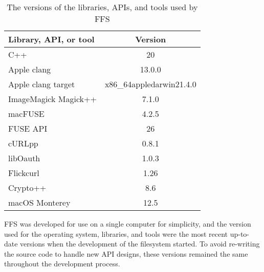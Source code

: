 \begin{table}[!ht]
	\begin{center}
		\caption{The versions of the libraries, APIs, and tools used by \gls{FFS}}
		\begin{tabular}{| l || c |}
			
			\hline

			\textbf{Library, API, or tool} & \textbf{Version}\\
			
			\hline
			\hline
			
				C++						& 20 \\
				Apple clang 			& 13.0.0\\
				Apple clang target		& x86\_64\-apple\-darwin21.4.0\\
				ImageMagick Magick++	& 7.1.0\-29\\
				macFUSE					& 4.2.5 \\
				FUSE API				& 26 \\
				cURLpp					& 0.8.1 \\
				libOauth				& 1.0.3 \\
				Flickcurl				& 1.26 \\
				Crypto++				& 8.6 \\
				macOS Monterey			& 12.5\\

			\hline
		\end{tabular}
		\label{tbl:dev_env}
	\end{center}

\end{table}

\gls{FFS} was developed for use on a single computer for simplicity, and the version used for the operating system, libraries, and tools were the most recent \mbox{up-to-date} versions when the development of the filesystem started. To avoid \mbox{re-writing} the source code to handle new \gls{API} designs, these versions remained the same throughout the development process.